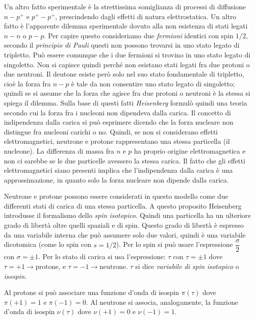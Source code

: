Un altro fatto sperimentale è la strettissima somiglianza di processi di
diffusione $n-p^{+}$ e $p^{+}-p^{+}$, prescindendo dagli effetti di natura
elettrostatica. Un altro fatto è l'apparente dilemma  sperimentale dovuto alla
non esistenza di stati legati $n-n$ o $p-p$.
Per capire questo consideriamo due \textit{fermioni} identici con spin $1/2$,
secondo il \textit{principio di Pauli} questi non possono trovarsi in uno stato
legato di tripletto. Può essere comunque che i due fermioni si trovino in uno
stato legato di singoletto. Non si capisce quindi perché non esistano stati
legati fra due protoni o due neutroni. Il deutone esiste però solo nel suo stato
fondamentale di tripletto, cioè la forza fra $n-p$ è tale da non consentire uno
stato legato di singoletto; quindi se si assume che la forza che agisce fra due
protoni o neutroni è la stessa si spiega il dilemma.
Sulla base di questi fatti \textit{Heisenberg} formulò quindi una teoria secondo
cui la forza fra i nucleoni non dipendeva dalla carica.
Il concetto di indipendenza dalla carica si può esprimere dicendo che la forza
nucleare non distingue fra nucleoni carichi o no. Quindi, se non si considerano
effetti elettromagnetici, neutrone e protone rappresentano una stessa particella
(il nucleone). La differenza di massa fra $n$ e $p$ ha proprio origine
elettromagnetica e non ci sarebbe se le due particelle avessero la stessa
carica. Il fatto che gli effetti elettromagnetici siano presenti implica che
l'indipendenza dalla carica è una approssimazione, in quanto solo la forza
nucleare non dipende dalla carica.

Neutrone e protone possono essere considerati in questo modello come due
differenti stati di carica di una stessa particella. A questo proposito
Heisenberg introdusse il formalismo dello \textit{spin isotopico}.
Quindi una particella ha un ulteriore grado di libertà oltre quelli spaziali e
di spin. Questo grado di libertà è espresso da una variabile interna che può
assumere solo due valori, quindi è una variabile dicotomica (come lo spin con
$s=1/2$). Per lo spin si può usare l'espressione $\dfrac{\sigma}{2}$ con
$\sigma=\pm 1$. Per lo stato di carica si usa l'espressione: $\tau$ con $\tau =
\pm 1$ dove $\tau= +1 \rightarrow \text{protone}$, e $\tau= -1 \rightarrow
\text{neutrone}$.
 $\tau$ si dice \textit{variabile di spin isotopico} o  \textit{isospin}.

Al protone si può associare una funzione d'onda di isospin $\pi(\tau)$ dove
$\pi(+1) = 1$ e $\pi(-1) = 0$. Al neutrone si associa, analogamente, la funzione
d'onda di isospin $\nu(\tau)$ dove $\nu(+1) = 0$ e $\nu(-1) = 1$.

